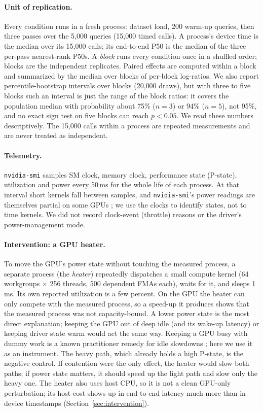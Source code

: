 \paragraph{Unit of replication.} Every condition runs in a fresh process: dataset load, 200 warm-up queries, then three passes over the 5{,}000 queries (15{,}000 timed calls). A process's device time is the median over its 15{,}000 calls; its end-to-end P50 is the median of the three per-pass nearest-rank P50s. A \emph{block} runs every condition once in a shuffled order; blocks are the independent replicates. Paired effects are computed within a block and summarized by the median over blocks of per-block log-ratios. We also report percentile-bootstrap intervals over blocks (20{,}000 draws), but with three to five blocks such an interval is just the range of the block ratios: it covers the population median with probability about 75\% ($n=3$) or 94\% ($n=5$), not 95\%, and no exact sign test on five blocks can reach $p<0.05$. We read these numbers descriptively. The 15{,}000 calls within a process are repeated measurements and are never treated as independent.

\paragraph{Telemetry.} \texttt{nvidia-smi} samples SM clock, memory clock, performance state (P-state), utilization and power every 50\,ms for the whole life of each process. At that interval short kernels fall between samples, and \texttt{nvidia-smi}'s power readings are themselves partial on some GPUs \citep{yang2023parttime}; we use the clocks to identify states, not to time kernels. We did not record clock-event (throttle) reasons or the driver's power-management mode.

\paragraph{Intervention: a GPU heater.} To move the GPU's power state without touching the measured process, a separate process (the \emph{heater}) repeatedly dispatches a small compute kernel (64 workgroups $\times$ 256 threads, 500 dependent FMAs each), waits for it, and sleeps 1\,ms. Its own reported utilization is a few percent. On the GPU the heater can only compete with the measured process, so a speed-up it produces shows that the measured process was not capacity-bound. A lower power state is the most direct explanation; keeping the GPU out of deep idle (and its wake-up latency) or keeping driver state warm would act the same way. Keeping a GPU busy with dummy work is a known practitioner remedy for idle slowdowns \citep{nvidia_forum_idle,volkov2016latency}; here we use it as an instrument. The heavy path, which already holds a high P-state, is the negative control. If contention were the only effect, the heater would slow both paths; if power state matters, it should speed up the light path and slow only the heavy one. The heater also uses host CPU, so it is not a clean GPU-only perturbation; its host cost shows up in end-to-end latency much more than in device timestamps (Section~\ref{sec:intervention}).

